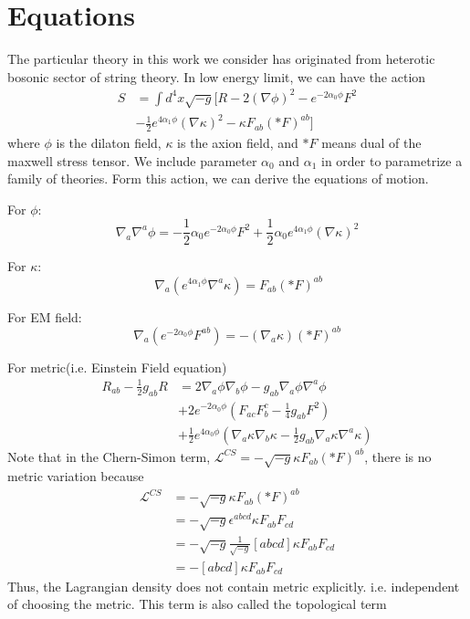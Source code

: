 \documentclass[%
 reprint,
 amsmath,amssymb,
 aps,
]{revtex4-1}
\begin{document}
\section{Equations}
The particular theory in this work we consider has originated from heterotic bosonic sector of string theory. In low energy limit, we can have the action
\begin{align}
S&=\int d^4 x \sqrt{-g} \Bigg[R - 2 (\nabla \phi)^2 - e^{-2 \alpha_0 \phi} F^2 \nonumber \\
   &-\frac{1}{2} e^{4 \alpha_1 \phi} (\nabla \kappa)^2 - \kappa F_{ab} ( \ast  F )^{ab} \Bigg]
\end{align}
where $\phi$ is the dilaton field, $\kappa$ is the axion field, and $\ast F$ means dual of the maxwell stress tensor. We include parameter $\alpha_0$ and $\alpha_1$ in order to parametrize a family of theories. Form this action, we can derive the equations of motion. 

For $\phi$:
\begin{equation}
\nabla_a \nabla^a \phi = -\frac{1}{2} \alpha_0 e^{-2 \alpha_0 \phi} F^2 + \frac{1}{2} \alpha_0 e^{4 \alpha_1 \phi} (\nabla \kappa)^2
\end{equation}

For $\kappa$:
\begin{equation}\
\nabla_a \left(e^{4 \alpha_1 \phi} \nabla^a \kappa \right) = F_{ab} (\ast F)^{ab}
\end{equation}

For EM field:
\begin{equation}
\nabla_a \left(e^{-2 \alpha_0 \phi} F^{ab}\right) = - (\nabla_a \kappa) (\ast F)^{ab}
\end{equation}

For metric(i.e. Einstein Field equation)
\begin{align}
R_{ab} -\frac{1}{2} g_{ab} R &= 2 \nabla_a \phi \nabla_b \phi - g_{ab} \nabla_a \phi \nabla^a \phi \nonumber \\
					   &+ 2 e^{-2 \alpha_0 \phi} ( F_{ac} F_b^c -\frac{1}{4} g_{ab} F^2)\nonumber \\
					   & + \frac{1}{2} e^{4 \alpha_0 \phi} (\nabla_a \kappa \nabla_b \kappa -\frac{1}{2} g_{ab} \nabla_a \kappa \nabla^a \kappa) 
\end{align}
Note that in the Chern-Simon term, $\mathcal{L}^{CS}= - \sqrt{-g} \kappa F_{ab} (\ast F)^{ab}$, there is no metric variation because 
\begin{align}
\mathcal{L}^{CS} &= - \sqrt{-g} \kappa F_{ab} (\ast F)^{ab} \nonumber \\
			   &=	- \sqrt{-g} \epsilon^{abcd}\kappa F_{ab} F_{cd} \nonumber \\
			   & =- \sqrt{-g} \frac{1}{\sqrt{-g}} \left[abcd\right] \kappa F_{ab} F_{cd} \nonumber \\
			   & =- \left[abcd\right] \kappa F_{ab} F_{cd} \nonumber
\end{align}
Thus, the Lagrangian density does not contain metric explicitly. i.e. independent of choosing the metric. This term is also called the topological term
\end{document}
